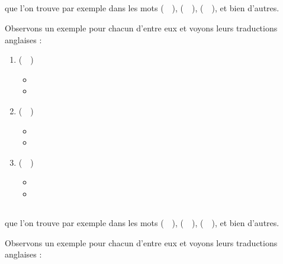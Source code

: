 \subsection{}\label{subsec:atfr}
que l'on trouve par exemple dans les mots
 (~~),  (~~),  (~~), et bien d'autres.

Observons un exemple pour chacun d'entre eux et voyons leurs
traductions anglaises :\par

\begin{enumerate}
\item {} (~~)
  \begin{itemize}
  \item {}
    \item {}
    \end{itemize}
\item {} (~~)
  \begin{itemize}
  \item {}
  \item {}
  \end{itemize}
\item {} (~~)
  \begin{itemize}
  \item {}
  \item {}
  \end{itemize}
\end{enumerate}         

\subsection{}\label{subsec:etfr}
 que l'on trouve par exemple dans les mots
 (~~),  (~~),  (~~), et bien d'autres.

Observons un exemple pour chacun d'entre eux et voyons leurs
traductions anglaises :\par

